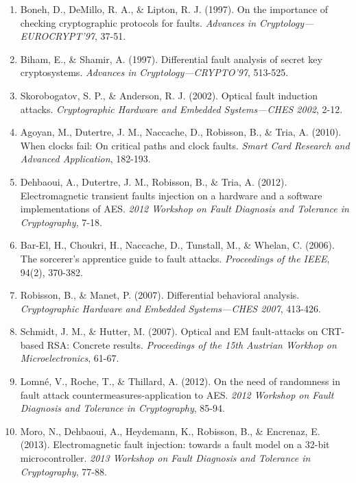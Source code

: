 \documentclass[12pt,a4paper]{article}
\begin{document}
\begin{enumerate}
    \item Boneh, D., DeMillo, R. A., \& Lipton, R. J. (1997). On the importance of checking cryptographic protocols for faults. \textit{Advances in Cryptology—EUROCRYPT'97}, 37-51.

    \item Biham, E., \& Shamir, A. (1997). Differential fault analysis of secret key cryptosystems. \textit{Advances in Cryptology—CRYPTO'97}, 513-525.

    \item Skorobogatov, S. P., \& Anderson, R. J. (2002). Optical fault induction attacks. \textit{Cryptographic Hardware and Embedded Systems—CHES 2002}, 2-12.

    \item Agoyan, M., Dutertre, J. M., Naccache, D., Robisson, B., \& Tria, A. (2010). When clocks fail: On critical paths and clock faults. \textit{Smart Card Research and Advanced Application}, 182-193.

    \item Dehbaoui, A., Dutertre, J. M., Robisson, B., \& Tria, A. (2012). Electromagnetic transient faults injection on a hardware and a software implementations of AES. \textit{2012 Workshop on Fault Diagnosis and Tolerance in Cryptography}, 7-18.

    \item Bar-El, H., Choukri, H., Naccache, D., Tunstall, M., \& Whelan, C. (2006). The sorcerer's apprentice guide to fault attacks. \textit{Proceedings of the IEEE}, 94(2), 370-382.

    \item Robisson, B., \& Manet, P. (2007). Differential behavioral analysis. \textit{Cryptographic Hardware and Embedded Systems—CHES 2007}, 413-426.

    \item Schmidt, J. M., \& Hutter, M. (2007). Optical and EM fault-attacks on CRT-based RSA: Concrete results. \textit{Proceedings of the 15th Austrian Workhop on Microelectronics}, 61-67.

    \item Lomné, V., Roche, T., \& Thillard, A. (2012). On the need of randomness in fault attack countermeasures-application to AES. \textit{2012 Workshop on Fault Diagnosis and Tolerance in Cryptography}, 85-94.

    \item Moro, N., Dehbaoui, A., Heydemann, K., Robisson, B., \& Encrenaz, E. (2013). Electromagnetic fault injection: towards a fault model on a 32-bit microcontroller. \textit{2013 Workshop on Fault Diagnosis and Tolerance in Cryptography}, 77-88.
\end{enumerate}
\end{document}
